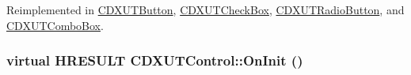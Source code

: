 Reimplemented in \hyperlink{class_c_d_x_u_t_button_ae63ba50da1c035a9aaa983bafd5eae97}{CDXUTButton}, \hyperlink{class_c_d_x_u_t_check_box_a5d9a74ce30be05f4867945c80f298a0a}{CDXUTCheckBox}, \hyperlink{class_c_d_x_u_t_radio_button_a2950447936727f33130fa4f6928045ac}{CDXUTRadioButton}, and \hyperlink{class_c_d_x_u_t_combo_box_a09eecfbd4d5173cf55c15c583b1a2209}{CDXUTComboBox}.\hypertarget{class_c_d_x_u_t_control_a8f1418d201b97e0a9dc83a0e25207eca}{
\subsubsection[{OnInit}]{\setlength{\rightskip}{0pt plus 5cm}virtual HRESULT CDXUTControl::OnInit ()}}
\label{class_c_d_x_u_t_control_a8f1418d201b97e0a9dc83a0e25207eca}


